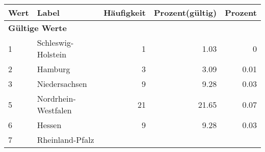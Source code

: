      \begin{longtable}{lXrrr}
     \toprule
     \textbf{Wert} & \textbf{Label} & \textbf{Häufigkeit} & \textbf{Prozent(gültig)} & \textbf{Prozent} \\
     \endhead
     \midrule
     \multicolumn{5}{l}{\textbf{Gültige Werte}}\\

     1 &
     \multicolumn{1}{X}{ Schleswig-Holstein   } &


       \num{1} &
       \num[round-mode=places,round-precision=2]{1.03} &
         \num[round-mode=places,round-precision=2]{0} \\

     2 &
     \multicolumn{1}{X}{ Hamburg   } &


       \num{3} &
       \num[round-mode=places,round-precision=2]{3.09} &
         \num[round-mode=places,round-precision=2]{0.01} \\

     3 &
     \multicolumn{1}{X}{ Niedersachsen   } &


       \num{9} &
       \num[round-mode=places,round-precision=2]{9.28} &
         \num[round-mode=places,round-precision=2]{0.03} \\

     5 &
     \multicolumn{1}{X}{ Nordrhein-Westfalen   } &


       \num{21} &
       \num[round-mode=places,round-precision=2]{21.65} &
         \num[round-mode=places,round-precision=2]{0.07} \\

     6 &
     \multicolumn{1}{X}{ Hessen   } &


       \num{9} &
       \num[round-mode=places,round-precision=2]{9.28} &
         \num[round-mode=places,round-precision=2]{0.03} \\

     7 &
     \multicolumn{1}{X}{ Rheinland-Pfalz   } &



\end{longtable}
